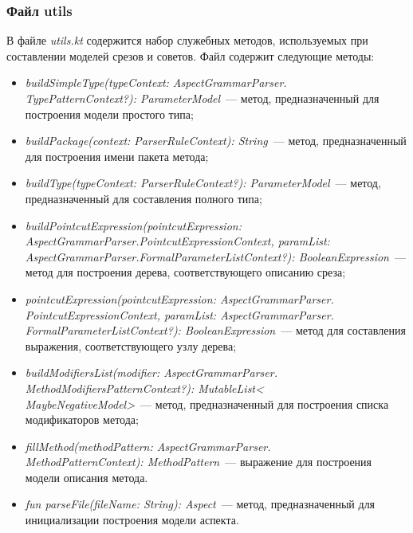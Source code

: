 \subsubsection{Файл utils}
\label{ssub:utils}
В файле \textit{utils.kt} содержится набор служебных методов, используемых при
составлении моделей срезов и советов.
Файл содержит следующие методы:
\begin{itemize}
	\item \textit{buildSimpleType(typeContext: AspectGrammarParser.\\TypePatternContext?): ParameterModel}~--- метод, предназначенный для построения модели простого типа;
	\item \textit{buildPackage(context: ParserRuleContext): String}~--- метод, предназначенный для построения имени пакета метода;
	\item \textit{buildType(typeContext: ParserRuleContext?): ParameterModel}~--- метод, предназначенный для составления полного типа;
	\item \textit{buildPointcutExpression(pointcutExpression: AspectGrammarParser.PointcutExpressionContext, paramList: AspectGrammarParser.FormalParameterListContext?): BooleanExpression}~--- метод для построения дерева, соответствующего описанию среза;
	\item \textit{pointcutExpression(pointcutExpression: AspectGrammarParser.\\PointcutExpressionContext, paramList: AspectGrammarParser.\\FormalParameterListContext?): BooleanExpression}~--- метод для составления выражения, соответствующего узлу дерева;
	\item \textit{buildModifiersList(modifier: AspectGrammarParser.\\MethodModifiersPatternContext?): MutableList<\\MaybeNegativeModel>}~--- метод, предназначенный для построения списка модификаторов метода;
	\item \textit{fillMethod(methodPattern: AspectGrammarParser.\\MethodPatternContext): MethodPattern}~--- выражение для построения модели описания метода.
	\item \textit{fun parseFile(fileName: String): Aspect}~--- метод, предназначенный для инициализации построения модели аспекта.
\end{itemize}
